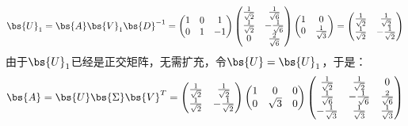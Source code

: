 \documentclass[12pt, a4paper, oneside, UTF8]{ctexbook}
\begin{document}
\begin{solution}
\begin{enumerate}[label=(\arabic*)]
        \begin{align*}
            \bs{U}_1=\bs{A}\bs{V}_1\bs{D}^{-1}=
            \begin{pmatrix}
                1& 0&1\\
                0 & 1&-1 \\
            \end{pmatrix}\begin{pmatrix}
                \frac{1}{\sqrt{2}}&\frac{1}{\sqrt{6}}\\
                \frac{1}{\sqrt{2}}&-\frac{1}{\sqrt{6}}\\
                0&\frac{2}{\sqrt{6}}\\
            \end{pmatrix} \begin{pmatrix}
                1& 0\\
                0& \frac{1}{\sqrt{3}}
            \end{pmatrix}=\begin{pmatrix}
                \frac{1}{\sqrt{2}}&\frac{1}{\sqrt{2}}\\
                \frac{1}{\sqrt{2}}&-\frac{1}{\sqrt{2}}\\
            \end{pmatrix}
        \end{align*}
        由于$\bs{U}_1$已经是正交矩阵，无需扩充，令$\bs{U}=\bs{U}_1$，于是：
        \begin{align*}
            \bs{A}=\bs{U}\bs{\Sigma}\bs{V}^T=\begin{pmatrix}
                \frac{1}{\sqrt{2}}&\frac{1}{\sqrt{2}}\\
                \frac{1}{\sqrt{2}}&-\frac{1}{\sqrt{2}}\\
            \end{pmatrix}
            \begin{pmatrix}
                1 & 0&0\\
                0 & \sqrt{3}&0 \\
            \end{pmatrix}
            \begin{pmatrix}
                \frac{1}{\sqrt{2}}&\frac{1}{\sqrt{2}}&0\\
                \frac{1}{\sqrt{6}}&-\frac{1}{\sqrt{6}}&\frac{2}{\sqrt{6}}\\
                -\frac{1}{\sqrt{3}}&\frac{1}{\sqrt{3}}&\frac{1}{\sqrt{3}}
            \end{pmatrix}
        \end{align*}
    \end{enumerate}
\end{solution}
\end{document}

